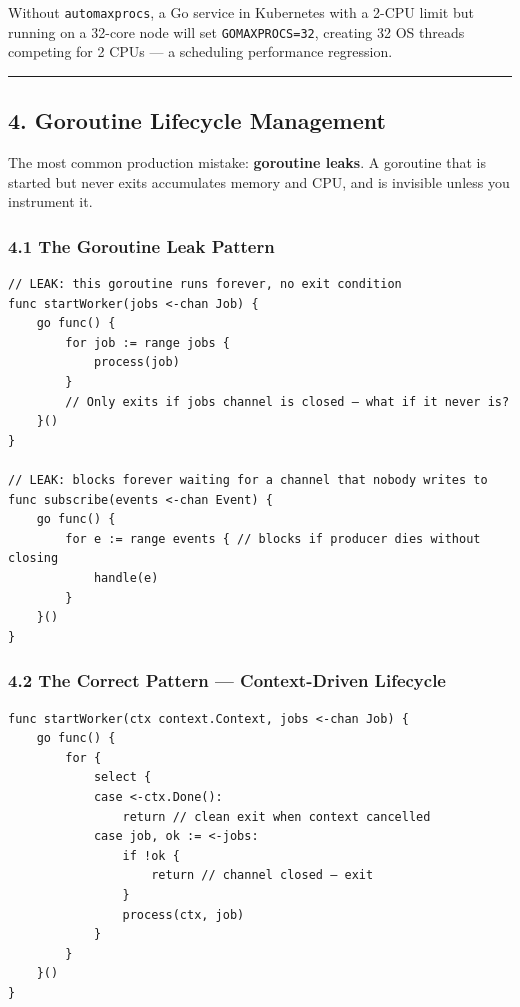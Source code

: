 \documentclass[11pt,a4paper,oneside]{book}
\begin{document}
Without \texttt{automaxprocs}, a Go service in Kubernetes with a 2-CPU
limit but running on a 32-core node will set \texttt{GOMAXPROCS=32},
creating 32 OS threads competing for 2 CPUs --- a scheduling performance
regression.

\begin{center}\rule{0.5\linewidth}{0.5pt}\end{center}

\subsection{4. Goroutine Lifecycle
Management}

The most common production mistake: \textbf{goroutine leaks}. A
goroutine that is started but never exits accumulates memory and CPU,
and is invisible unless you instrument it.

\subsubsection{4.1 The Goroutine Leak
Pattern}

\begin{verbatim}
// LEAK: this goroutine runs forever, no exit condition
func startWorker(jobs <-chan Job) {
    go func() {
        for job := range jobs {
            process(job)
        }
        // Only exits if jobs channel is closed — what if it never is?
    }()
}

// LEAK: blocks forever waiting for a channel that nobody writes to
func subscribe(events <-chan Event) {
    go func() {
        for e := range events { // blocks if producer dies without closing
            handle(e)
        }
    }()
}
\end{verbatim}

\subsubsection{4.2 The Correct Pattern --- Context-Driven
Lifecycle}

\begin{verbatim}
func startWorker(ctx context.Context, jobs <-chan Job) {
    go func() {
        for {
            select {
            case <-ctx.Done():
                return // clean exit when context cancelled
            case job, ok := <-jobs:
                if !ok {
                    return // channel closed — exit
                }
                process(ctx, job)
            }
        }
    }()
}
\end{verbatim}
\end{document}
